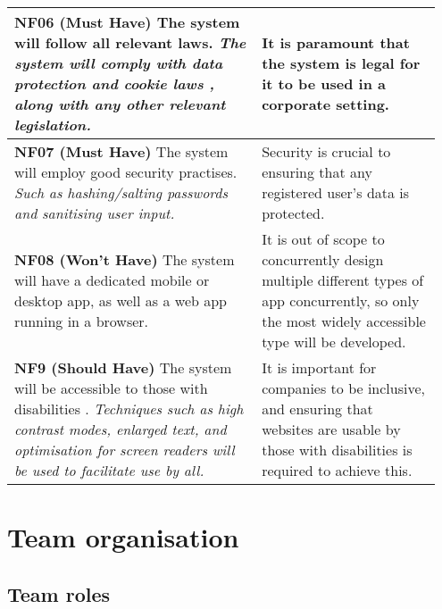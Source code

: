 \documentclass[10pt]{article}
\begin{document}
\begin{longtable}{|p{0.55\linewidth}|p{0.4\linewidth}|}
    \textbf{NF06 (Must Have) }
    The system will follow all relevant laws.
    \textit{The system will comply with data protection \cite{data_protection}
    and cookie laws \cite{cookie_law}, along with any other relevant
    legislation.}
        &
    It is paramount that the system is legal for it to be used in a corporate
    setting.
    \\ \hline

    \textbf{NF07 (Must Have) }
    The system will employ good security practises.
    \textit{Such as hashing/salting passwords and sanitising user input.}
        &
    Security is crucial to ensuring that any registered user's data is
    protected.
    \\ \hline

    \textbf{NF08 (Won't Have) }
    The system will have a dedicated mobile or desktop app, as well as a web app
    running in a browser.
        &
    It is out of scope to concurrently design multiple different types of app
    concurrently, so only the most widely accessible type will be developed.
    \\ \hline

    \textbf{NF9 (Should Have) }
    The system will be accessible to those with disabilities \cite{accessibility}.
    \textit{Techniques such as high contrast modes, enlarged text, and
    optimisation for screen readers will be used to facilitate use by all.}
        &
    It is important for companies to be inclusive, and ensuring that websites
    are usable by those with disabilities is required to achieve this.
    \\ \hline
\end{longtable}

\vspace{-4mm}\section{Team organisation}\vspace{-2mm}
\subsection{Team roles}\vspace{-2mm}
\end{document}
